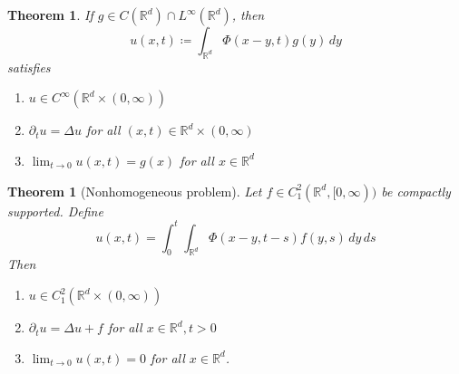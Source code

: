 \documentclass{report}
\theoremstyle{tommy}
\newtheorem{thm}[defn]{Theorem}
\begin{document}
  \begin{thm}
    If \(g \in C(\mathbb{R}^d) \cap L^\infty(\mathbb{R}^d)\), then 
    \[u(x,t) \coloneqq \int_{\mathbb{R}^d} \Phi(x-y,t) g(y) \, dy\]
    satisfies
    
    \begin{enumerate}[label=(\roman*)]
      \item \(u \in C^\infty(\mathbb{R}^d \times (0,\infty))\)
      \item \(\partial_t u = \Delta u\) for all \((x,t) \in \mathbb{R}^d \times (0,\infty)\)
      \item \(\lim_{t \to 0} u(x,t) = g(x)\) for all \(x \in \mathbb{R}^d\)
    \end{enumerate}
  \end{thm}

  \begin{thm}[Nonhomogeneous problem]
    Let \(f \in C_1^2(\mathbb{R}^d, [0,\infty))\) be compactly supported. Define
    \[u(x,t) = \int_0^t \int_{\mathbb{R}^d} \Phi(x-y, t-s) f(y,s) \, dy\, ds\]
    Then 
    \begin{enumerate}[label=(\roman*)]
      \item \(u \in C_1^2(\mathbb{R}^d \times (0,\infty))\)
      \item \(\partial_t u = \Delta u+ f\) for all \(x \in \mathbb{R}^d, t > 0\)
      \item \(\lim_{t \to 0} u(x,t) = 0\) for all \(x \in \mathbb{R}^d\).
    \end{enumerate}
  \end{thm}
\end{document}
